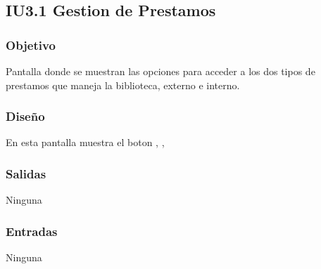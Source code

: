 \newpage
\subsection{IU3.1 Gestion de Prestamos}

\subsubsection{Objetivo}
	Pantalla donde se muestran las opciones para acceder a los dos tipos de prestamos que maneja la biblioteca, externo e interno.  

\subsubsection{Diseño}
	En esta pantalla muestra el boton , , 


\subsubsection{Salidas}
	\begin{Citemize}
		\item Ninguna
	\end{Citemize}
	
\subsubsection{Entradas}
	\begin{Citemize}
		\item Ninguna
	\end{Citemize}